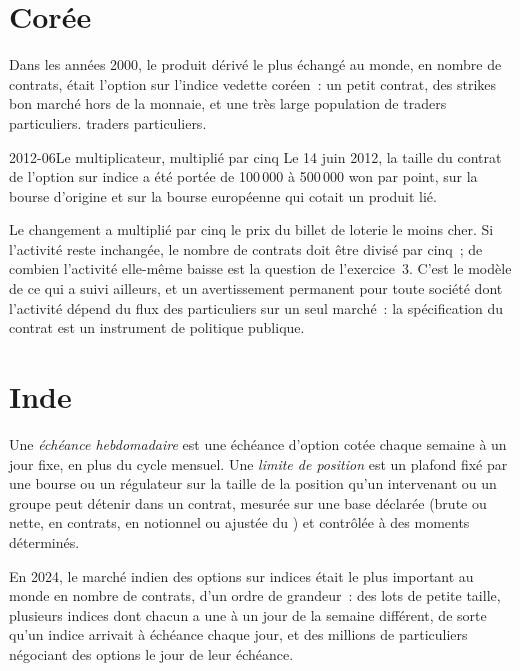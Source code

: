 \section{Corée}

Dans les années 2000, le produit dérivé le plus échangé au monde, en nombre de contrats, était
l'option sur l'indice vedette coréen~: un petit contrat, des strikes bon marché
hors de la monnaie, et une très large population de traders particuliers.
traders particuliers.

\begin{dated}{2012-06}{Le multiplicateur, multiplié par cinq}\label{dat:m1:options-markets-europe-asia:kospi}
Le 14 juin 2012, la taille du contrat de l'option sur indice a été portée de 100\,000
à 500\,000 won par point, sur la bourse d'origine et sur la bourse européenne
qui cotait un produit lié.
\end{dated}

Le changement a multiplié par cinq le prix du billet de loterie le moins cher.
Si l'activité reste inchangée, le nombre de contrats doit être divisé par cinq~; de combien
l'activité elle-même baisse est la question de l'exercice~3. C'est le
modèle de ce qui a suivi ailleurs, et un avertissement permanent pour toute société
dont l'activité dépend du flux des particuliers sur un seul marché~: la
spécification du contrat est un instrument de politique publique.

\section{Inde}

\begin{definition}\label{def:m1:options-markets-europe-asia:weekly}
Une \emph{échéance hebdomadaire} est une échéance d'option cotée chaque
semaine à un jour fixe, en plus du cycle mensuel. Une \emph{limite de
position} est un plafond fixé par une bourse ou un régulateur sur la
taille de la position qu'un intervenant ou un groupe peut détenir dans un contrat,
mesurée sur une base déclarée (brute ou nette, en contrats, en notionnel ou
ajustée du ) et contrôlée à des moments déterminés.
\end{definition}

En 2024, le marché indien des options sur indices était le plus important au monde en
nombre de contrats, d'un ordre de grandeur~: des lots de petite taille, plusieurs indices dont chacun a une
 à un jour de la semaine différent, de sorte qu'un indice arrivait à échéance
chaque jour, et des millions de particuliers négociant des options le jour de leur échéance.

